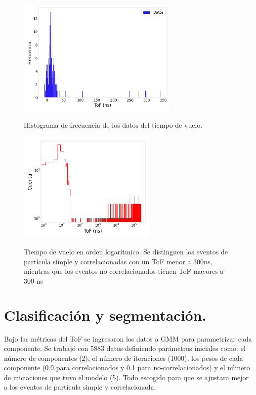 \begin{figure}[h!]
\begin{center}
\caption{ Histograma de frecuencia de los datos del tiempo de vuelo.}
\includegraphics[width=0.7\textwidth]{Figures/imagenes/7.png}

\label{ocho}
\end{center}
\end{figure}

\begin{figure}[h!]
\begin{center}
\caption{Tiempo de vuelo en orden logarítmico. Se distinguen los eventos de partícula simple y correlacionadas con un ToF menor a 300ns, mientras que los eventos no correlacionados tienen ToF mayores a 300 ns  }
\includegraphics[width=0.6\textwidth]{Figures/imagenes/8.png}

\label{nueve}
\end{center}
\end{figure}


\section{Clasificación y segmentación.}
 Bajo las métricas del ToF se ingresaron los datos a GMM para parametrizar cada componente. Se trabajó con 5883 datos definiendo parámetros iniciales como: el número de componentes (2), el número de iteraciones (1000), los pesos de cada componente (0.9 para correlacionados y 0.1 para no-correlacionados) y el número de iniciaciones que tuvo el modelo (5). Todo escogido para que se ajustara mejor a los eventos de partícula simple y correlacionada.
 
